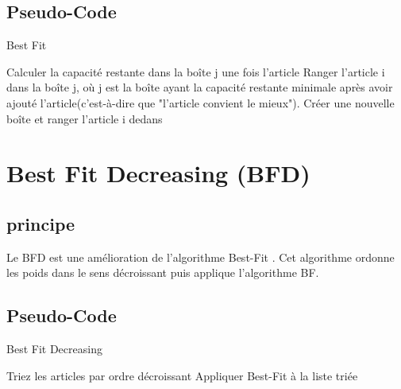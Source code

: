 \documentclass[class=article, crop=false]{standalone}
\begin{document}
\subsection{Pseudo-Code}
\begin{algorithm}[H]
    \caption{Best Fit}
    \begin{algorithmic}
              \STATE Calculer la capacité restante dans la boîte j une fois l'article
             \ENDIF 
        \ENDFOR
        \STATE Ranger l’article i dans la boîte j, où j est la boîte ayant la capacité restante minimale après avoir ajouté l’article(c'est-à-dire que "l’article convient le mieux").
            \STATE Créer une nouvelle boîte et ranger l’article i dedans
        \ENDIF
    \ENDFOR
    \end{algorithmic}
\end{algorithm}

\section{Best Fit Decreasing (BFD)}
\subsection{principe}
Le BFD est une amélioration de l’algorithme Best-Fit . Cet algorithme ordonne les poids dans le sens décroissant puis applique l’algorithme BF.

\subsection{Pseudo-Code}

\begin{algorithm}
    \caption{Best Fit Decreasing }
    \begin{algorithmic}
        \STATE Triez les articles par ordre décroissant
        \STATE Appliquer Best-Fit à la liste triée 
    \end{algorithmic}
\end{algorithm}
\end{document}
